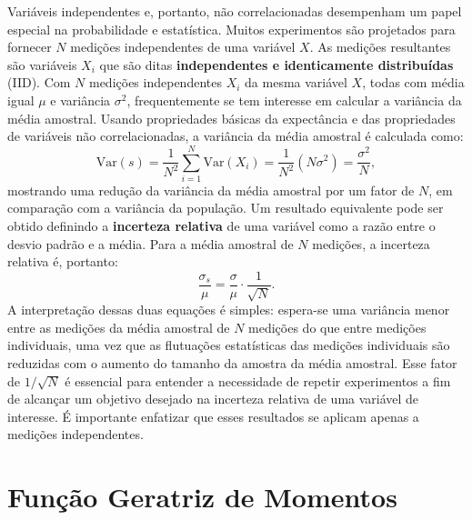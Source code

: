 Variáveis independentes e, portanto, não correlacionadas desempenham um papel especial na probabilidade e estatística. Muitos experimentos são projetados para fornecer $ N $ medições independentes de uma variável $ X $. As medições resultantes são variáveis $ X_i $ que são ditas \textbf{independentes e identicamente distribuídas} (IID). Com $ N $ medições independentes $ X_i $ da mesma variável $ X $, todas com média igual $ \mu $ e variância $ \sigma^2 $, frequentemente se tem interesse em calcular a variância da média amostral. Usando propriedades básicas da expectância e das propriedades de variáveis não correlacionadas, a variância da média amostral é calculada como:
\begin{equation*}
\text{Var}\left(s\right) = \dfrac{1}{N^2} \sum_{i=1}^{N} \text{Var}(X_i) = \dfrac{1}{N^2} \left( N \sigma^2\right) = \dfrac{\sigma^2}{N},
\end{equation*}
mostrando uma redução da variância da média amostral por um fator de $ N $, em comparação com a variância da população. Um resultado equivalente pode ser obtido definindo a \textbf{incerteza relativa} de uma variável como a razão entre o desvio padrão e a média. Para a média amostral de $ N $ medições, a incerteza relativa é, portanto:
\begin{equation*}
\dfrac{\sigma_s}{\mu} = \dfrac{\sigma}{\mu} \cdot \dfrac{1}{\sqrt{N}}.
\end{equation*}
A interpretação dessas duas equações é simples: espera-se uma variância menor entre as medições da média amostral de $ N $ medições do que entre medições individuais, uma vez que as flutuações estatísticas das medições individuais são reduzidas com o aumento do tamanho da amostra da média amostral. Esse fator de $ 1/\sqrt{N} $ é essencial para entender a necessidade de repetir experimentos a fim de alcançar um objetivo desejado na incerteza relativa de uma variável de interesse. É importante enfatizar que esses resultados se aplicam apenas a medições independentes.

\section{Função Geratriz de Momentos}

